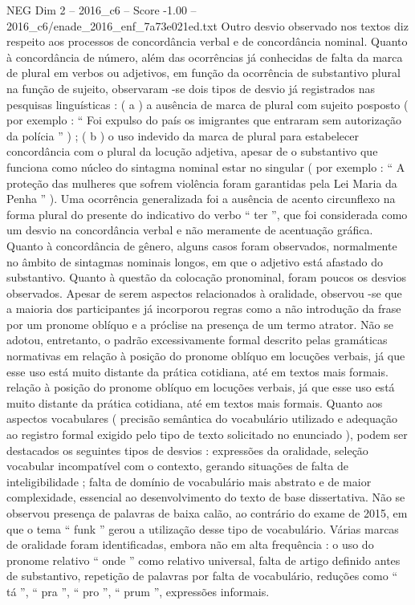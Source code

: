 \begin{textsample}{NEG Dim 2 – 2016\_c6 – Score -1.00 – 2016\_c6/enade\_2016\_enf\_7a73e021ed.txt}
Outro desvio observado nos textos diz respeito aos processos de concordância verbal e de concordância nominal.
Quanto à concordância de número, além das ocorrências já conhecidas de falta da marca de plural em verbos ou adjetivos, em função da ocorrência de substantivo plural na função de sujeito, observaram -se dois tipos de desvio já registrados nas pesquisas linguísticas : ( a ) a ausência de marca de plural com sujeito posposto ( por exemplo : “ Foi expulso do país os imigrantes que entraram sem autorização da polícia ” ) ; ( b ) o uso indevido da marca de plural para estabelecer concordância com o plural da locução adjetiva, apesar de o substantivo que funciona como núcleo do sintagma nominal estar no singular ( por exemplo : “ A proteção das mulheres que sofrem violência foram garantidas pela Lei Maria da Penha ” ).
Uma ocorrência generalizada foi a ausência de acento circunflexo na forma plural do presente do indicativo do verbo “ ter ”, que foi considerada como um desvio na concordância verbal e não meramente de acentuação gráfica.
Quanto à concordância de gênero, alguns casos foram observados, normalmente no âmbito de sintagmas nominais longos, em que o adjetivo está afastado do substantivo.
Quanto à questão da colocação pronominal, foram poucos os desvios observados.
Apesar de serem aspectos relacionados à oralidade, observou -se que a maioria dos participantes já incorporou regras como a não introdução da frase por um pronome oblíquo e a próclise na presença de um termo atrator.
Não se adotou, entretanto, o padrão excessivamente formal descrito pelas gramáticas normativas em relação à posição do pronome oblíquo em locuções verbais, já que esse uso está muito distante da prática cotidiana, até em textos mais formais. relação à posição do pronome oblíquo em locuções verbais, já que esse uso está muito distante da prática cotidiana, até em textos mais formais.
Quanto aos aspectos vocabulares ( precisão semântica do vocabulário utilizado e adequação ao registro formal exigido pelo tipo de texto solicitado no enunciado ), podem ser destacados os seguintes tipos de desvios : expressões da oralidade, seleção vocabular incompatível com o contexto, gerando situações de falta de inteligibilidade ; falta de domínio de vocabulário mais abstrato e de maior complexidade, essencial ao desenvolvimento do texto de base dissertativa.
Não se observou presença de palavras de baixa calão, ao contrário do exame de 2015, em que o tema “ funk ” gerou a utilização desse tipo de vocabulário.
Várias marcas de oralidade foram identificadas, embora não em alta frequência : o uso do pronome relativo “ onde ” como relativo universal, falta de artigo definido antes de substantivo, repetição de palavras por falta de vocabulário, reduções como “ tá ”, “ pra ”, “ pro ”, “ prum ”, expressões informais.

\end{textsample}
